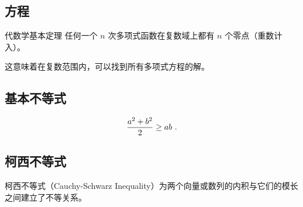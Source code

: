 
\begin{issues}
\issueDraft
\end{issues}

\subsection{方程}


\begin{definition}{代数学基本定理}
任何一个 $n$ 次多项式函数在复数域上都有 $n$ 个零点（重数计入）。
\end{definition}
这意味着在复数范围内，可以找到所有多项式方程的解。

\subsection{基本不等式}

\begin{equation}
{a^2+b^2\over2}\geq ab~.
\end{equation}

\subsection{柯西不等式}

柯西不等式（Cauchy-Schwarz Inequality）为两个向量或数列的内积与它们的模长之间建立了不等关系。
